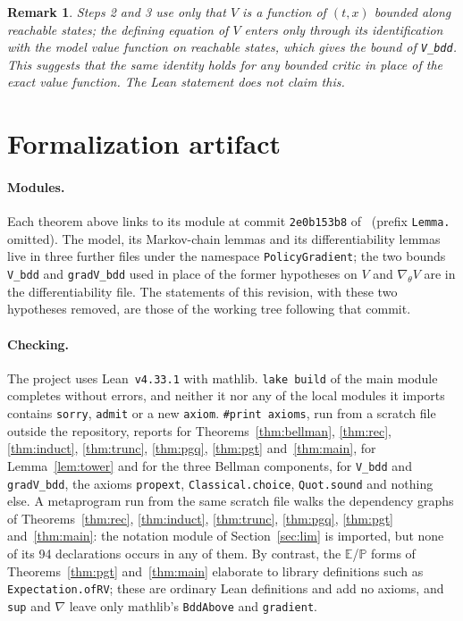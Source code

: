 \documentclass[11pt,a4paper]{article}
\newtheorem{remark}[theorem]{Remark}
\newcommand{\E}{\mathbb{E}}
\newcommand{\Prb}{\mathbb{P}}
\newcommand{\grad}{\nabla_{\theta}}
\begin{document}
\begin{remark}
Steps 2 and 3 use only that $V$ is a function of $(t,x)$ bounded along reachable states; the defining equation of $V$ enters only through its identification with the model value function on reachable states, which gives the bound of \texttt{V\_bdd}.
This suggests that the same identity holds for any bounded critic in place of the exact value function.
The Lean statement does not claim this.
\end{remark}

\section{Formalization artifact}
\label{sec:artifact}

\paragraph{Modules.}
Each theorem above links to its module at commit \texttt{2e0b153b8} of~\cite{lemma_repo} (prefix \texttt{Lemma.} omitted).
The model, its Markov-chain lemmas and its differentiability lemmas live in three further files under the namespace \texttt{PolicyGradient}; the two bounds \texttt{V\_bdd} and \texttt{gradV\_bdd} used in place of the former hypotheses on $V$ and $\grad V$ are in the differentiability file.
The statements of this revision, with these two hypotheses removed, are those of the working tree following that commit.

\paragraph{Checking.}
The project uses Lean~\texttt{v4.33.1} with mathlib.
\texttt{lake build} of the main module completes without errors, and neither it nor any of the local modules it imports contains \texttt{sorry}, \texttt{admit} or a new \texttt{axiom}.
\texttt{\#print axioms}, run from a scratch file outside the repository, reports for Theorems~\ref{thm:bellman}, \ref{thm:rec}, \ref{thm:induct}, \ref{thm:trunc}, \ref{thm:pgq}, \ref{thm:pgt} and~\ref{thm:main}, for Lemma~\ref{lem:tower} and for the three Bellman components, for \texttt{V\_bdd} and \texttt{gradV\_bdd}, the axioms
\texttt{propext}, \texttt{Classical.choice}, \texttt{Quot.sound}
and nothing else.
A metaprogram run from the same scratch file walks the dependency graphs of Theorems~\ref{thm:rec}, \ref{thm:induct}, \ref{thm:trunc}, \ref{thm:pgq}, \ref{thm:pgt} and~\ref{thm:main}: the notation module of Section~\ref{sec:lim} is imported, but none of its 94 declarations occurs in any of them.
By contrast, the $\E$/$\Prb$ forms of Theorems~\ref{thm:pgt} and~\ref{thm:main} elaborate to library definitions such as \texttt{Expectation.ofRV}; these are ordinary Lean definitions and add no axioms, and \texttt{sup} and $\nabla$ leave only mathlib's \texttt{BddAbove} and \texttt{gradient}.
\end{document}
